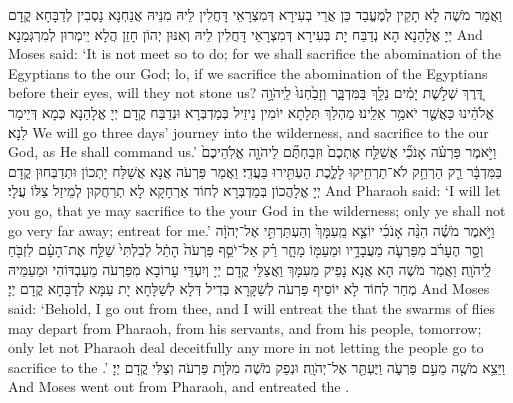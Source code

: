 {וַאֲמַר מֹשֶׁה לָא תָקֵין לְמֶעֱבַד כֵּן אֲרֵי בְעִירָא דְּמִצְרָאֵי דָּחֲלִין לֵיהּ מִנֵּיהּ אֲנַחְנָא נָסְבִין לְדַבָּחָא קֳדָם יְיָ אֱלָהַנָא הָא נְדַבַּח יָת בְּעִירָא דְּמִצְרָאֵי דָּחֲלִין לֵיהּ וְאִנּוּן יְהוֹן חָזַן הֲלָא יֵימְרוּן לְמִרְגְּמַנָא׃}
{And Moses said: ‘It is not meet so to do; for we shall sacrifice the abomination of the Egyptians to the \lord\space our God; lo, if we sacrifice the abomination of the Egyptians before their eyes, will they not stone us?}{}
{דֶּ֚רֶךְ שְׁלֹ֣שֶׁת יָמִ֔ים נֵלֵ֖ךְ בַּמִּדְבָּ֑ר וְזָבַ֙חְנוּ֙ לַֽיהֹוָ֣ה אֱלֹהֵ֔ינוּ כַּאֲשֶׁ֖ר יֹאמַ֥ר אֵלֵֽינוּ׃}
{מַהְלַךְ תְּלָתָא יוֹמִין נֵיזֵיל בְּמַדְבְּרָא וּנְדַבַּח קֳדָם יְיָ אֱלָהַנָא כְּמָא דְּיֵימַר לַנָא׃}
{We will go three days’ journey into the wilderness, and sacrifice to the \lord\space our God, as He shall command us.’}{}
{וַיֹּ֣אמֶר פַּרְעֹ֗ה אָנֹכִ֞י אֲשַׁלַּ֤ח אֶתְכֶם֙ וּזְבַחְתֶּ֞ם לַיהֹוָ֤ה אֱלֹֽהֵיכֶם֙ בַּמִּדְבָּ֔ר רַ֛ק הַרְחֵ֥ק לֹא־תַרְחִ֖יקוּ לָלֶ֑כֶת הַעְתִּ֖ירוּ בַּעֲדִֽי׃}
{וַאֲמַר פַּרְעֹה אֲנָא אֲשַׁלַּח יָתְכוֹן וּתְדַבְּחוּן קֳדָם יְיָ אֱלָהֲכוֹן בְּמַדְבְּרָא לְחוֹד אַרְחָקָא לָא תְרַחֲקוּן לְמֵיזַל צַלּוֹ עֲלָי׃}
{And Pharaoh said: ‘I will let you go, that ye may sacrifice to the \lord\space your God in the wilderness; only ye shall not go very far away; entreat for me.’}{}
{וַיֹּ֣אמֶר מֹשֶׁ֗ה הִנֵּ֨ה אָנֹכִ֜י יוֹצֵ֤א מֵֽעִמָּךְ֙ וְהַעְתַּרְתִּ֣י אֶל־יְהֹוָ֔ה וְסָ֣ר הֶעָרֹ֗ב מִפַּרְעֹ֛ה מֵעֲבָדָ֥יו וּמֵעַמּ֖וֹ מָחָ֑ר רַ֗ק אַל־יֹסֵ֤ף פַּרְעֹה֙ הָתֵ֔ל לְבִלְתִּי֙ שַׁלַּ֣ח אֶת־הָעָ֔ם לִזְבֹּ֖חַ לַֽיהֹוָֽה׃
}
{וַאֲמַר מֹשֶׁה הָא אֲנָא נָפֵיק מֵעִמָּךְ וַאֲצַלֵּי קֳדָם יְיָ וְיִעְדֵּי עָרוֹבָא מִפַּרְעֹה מֵעַבְדּוֹהִי וּמֵעַמֵּיהּ מְחַר לְחוֹד לָא יוֹסֵיף פַּרְעֹה לְשַׁקָּרָא בְּדִיל דְּלָא לְשַׁלָּחָא יָת עַמָּא לְדַבָּחָא קֳדָם יְיָ׃}
{And Moses said: ‘Behold, I go out from thee, and I will entreat the \lord\space that the swarms of flies may depart from Pharaoh, from his servants, and from his people, tomorrow; only let not Pharaoh deal deceitfully any more in not letting the people go to sacrifice to the \lord.’}{}
{וַיֵּצֵ֥א מֹשֶׁ֖ה מֵעִ֣ם פַּרְעֹ֑ה וַיֶּעְתַּ֖ר אֶל־יְהֹוָֽה׃
}
{וּנְפַק מֹשֶׁה מִלְּוָת פַּרְעֹה וְצַלִּי קֳדָם יְיָ׃}
{And Moses went out from Pharaoh, and entreated the \lord.}{}
